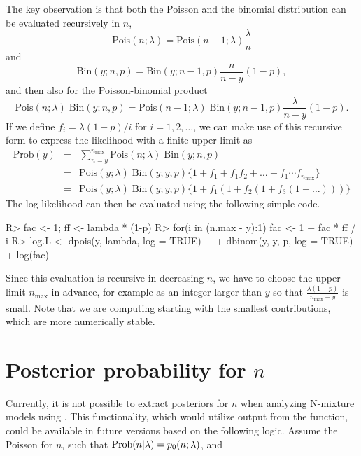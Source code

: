 \documentclass[codesnippet]{jss}
\begin{document}
The key observation is that both the Poisson and the binomial distribution can be evaluated recursively in $n$,
\begin{displaymath}
	\text{Pois}(n; \lambda) = \text{Pois}(n-1; \lambda) \frac{\lambda}{n}
\end{displaymath}
and
\begin{displaymath}
	\text{Bin}(y; n, p) = \text{Bin}(y; n-1, p) \frac{n}{n-y}(1-p),
\end{displaymath}
and then also for the Poisson-binomial product
\begin{displaymath}
	\text{Pois}(n ; \lambda) \; \text{Bin}(y;  n, p)
	=
	\text{Pois}(n-1; \lambda) \; \text{Bin}(y; n-1, p)
	\frac{\lambda}{n-y}(1-p).
\end{displaymath}
If we define $f_i = \lambda(1-p)/i$ for $i=1, 2, \ldots$, we can make use of this recursive form to express the likelihood with a finite upper limit as
\begin{eqnarray}
	\text{Prob}(y) &=& \sum_{n = y}^{n_{\text{max}}}
	\text{Pois}(n ; \lambda)\;
	\text{Bin}(y;  n, p) \nonumber\\
	&=& \text{Pois}(y; \lambda)\; \text{Bin}(y; y, p)
	\Big\{ 1 + f_1 + f_1f_2 +
	\ldots
	+f_1\cdots f_{n_\text{max}}
	\Big\} \nonumber\\
	&=& \text{Pois}(y; \lambda)\; \text{Bin}(y; y, p)
	\Big\{ 1 + f_1(1+f_2(1+f_3(1+ \dots)))\Big\}\nonumber
\end{eqnarray}
The log-likelihood can then be evaluated using the following simple  code.
\begin{CodeInput}
R> fac <- 1; ff <- lambda * (1-p)
R> for(i in (n.max - y):1) fac <- 1 + fac * ff / i
R> log.L <- dpois(y, lambda, log = TRUE) +
+    dbinom(y, y, p, log = TRUE) + log(fac)
\end{CodeInput}
Since this evaluation is recursive in decreasing $n$, we have to choose the upper limit $n_\text{max}$ in advance, for example as an integer larger than $y$ so that $\frac{\lambda (1-p)}{n_\text{max}-y}$ is small. Note that we are computing  starting with the smallest contributions, which are more numerically stable.

\section{Posterior probability for $n$}
Currently, it is not possible to extract posteriors for $n$ when analyzing N-mixture models using . This functionality, which would utilize output from the  function, could be available in future versions based on the following logic. Assume the Poisson for $n$, such that $\textnormal{Prob} (n | \lambda) = p_0(n; \lambda)$, and
\end{document}
